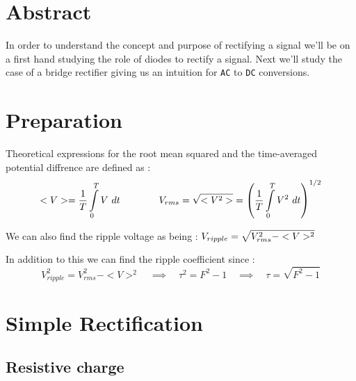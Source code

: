 \documentclass[11pt, openright]{book}
\begin{document}




\vspace*{\fill}

\section{Abstract}

In order to understand the concept and purpose of rectifying a signal we'll be on a first hand studying the role of diodes to rectify a signal. Next we'll study the case of a bridge rectifier giving us an intuition for \verb|AC| to \verb|DC| conversions. 

\newpage

\section{Preparation}

Theoretical expressions for the root mean squared and the time-averaged potential diffrence are defined as :
$$\displaystyle{<V>=\frac{1}{T}\int\limits^{T}_{0}V\ dt}\qquad \qquad \displaystyle{V_{rms}=\sqrt{<V^2>}}=\displaystyle{\left( \frac{1}{T}\int\limits^{T}_{0} V^2\ dt \right)^{1/2}}$$

We can also find the ripple voltage as being : $\displaystyle{V_{ripple}=\sqrt{V_{rms}^{2}-<V>^2}}$

In addition to this we can find the ripple coefficient since :\\ $$V^{2}_{ripple}=V^{2}_{rms}-<V>^2\quad \implies \quad \tau^2=F^2-1\quad \implies \quad \tau=\sqrt{F^2-1} $$


\section{Simple Rectification}
\subsection{Resistive charge}
\end{document}
